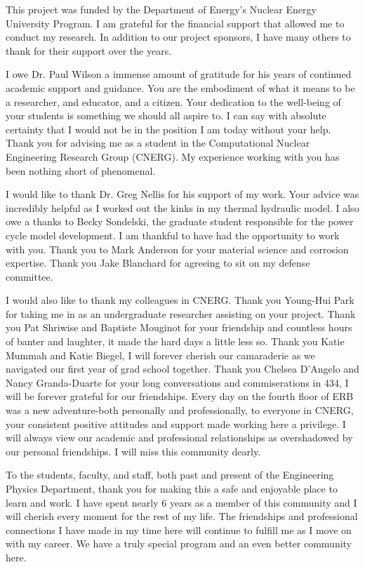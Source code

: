 This project was funded by the Department of Energy's Nuclear Energy University
Program. I am grateful for the financial support that allowed me to conduct my
research. In addition to our project sponsors, I have many others 
to thank for their support over the years. 

I owe Dr. Paul Wilson a immense amount of gratitude for his years of continued
academic support and guidance. You are the embodiment of what it means to be
a researcher, and educator, and a citizen. Your dedication to the well-being of your
students is something we should all aspire to. I can say with absolute
certainty that I would not be in the position I am today without your help. 
Thank you for advising me as a student in the Computational Nuclear Engineering 
Research Group (CNERG). My experience working with you has been nothing short of phenomenal.

I would like to thank Dr. Greg Nellis for his support of my work. 
Your advice was incredibly helpful as I worked out the kinks 
in my thermal hydraulic model. I also owe a thanks to Becky Sondelski, 
the graduate student responsible for the power cycle model development. 
I am thankful to have had the opportunity to work with you. Thank you to Mark
Anderson for your material science and corrosion expertise. Thank you Jake
Blanchard for agreeing to sit on my defense committee.

I would also like to thank my colleagues in CNERG. Thank you Young-Hui Park 
for taking me in as an undergraduate researcher assisting on your project. Thank you
Pat Shriwise and Baptiste Mouginot for your friendship and countless hours of
banter and laughter, it made the hard days a little less so. Thank you Katie
Mummah and Katie Biegel, I will forever cherish our camaraderie as we navigated
our first year of grad school together. Thank you Chelsea D'Angelo and Nancy
Granda-Duarte for your long conversations and commiserations in 434, I will be
forever grateful for our friendships. Every day on the fourth floor of ERB 
was a new adventure-both personally and professionally, to everyone in CNERG,
your consistent positive attitudes and support made working here a privilege. I
will always view our academic and professional relationships as overshadowed by
our personal friendships. I will miss this community dearly.

To the students, faculty, and staff, both past and present of the Engineering
Physics Department, thank you for making this a safe and enjoyable place to
learn and work. I have spent nearly 6 years as a member of this community and I
will cherish every moment for the rest of my life. The friendships and
professional connections I have made in my time here will continue to fulfill me
as I move on with my career. We have a truly special program and
an even better community here.

